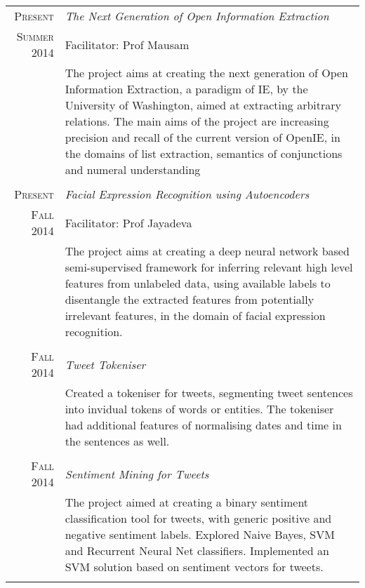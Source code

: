 \documentclass[a4paper,10pt]{article} %
\begin{document}
\begin{tabular}{r|p{11cm}}

\textsc{Present} & \emph{The Next Generation of Open Information Extraction}\\ 
\textsc{Summer 2014} & Facilitator: Prof Mausam \\ &\footnotesize{The project aims at creating the next generation of Open Information Extraction, a paradigm of IE, by the University of Washington, aimed at extracting arbitrary relations. The main aims of the project are increasing precision and recall of the current version of OpenIE, in  the domains of list extraction, semantics of conjunctions and numeral understanding }\\
\multicolumn{2}{c}{} \\


\textsc{Present} & \emph{Facial Expression Recognition using Autoencoders}\\ 
\textsc{Fall 2014} & Facilitator: Prof Jayadeva \\ & \footnotesize{The project aims at creating a deep neural network based semi-supervised framework for inferring relevant high level features from unlabeled data, using available labels to disentangle the extracted features from potentially irrelevant features, in the domain of facial expression recognition.}\\
\multicolumn{2}{c}{} \\


\textsc{Fall 2014}& \emph{Tweet Tokeniser}\\ 
 & \footnotesize{Created a tokeniser for tweets, segmenting tweet sentences into invidual tokens of words or entities. The tokeniser had additional features of normalising dates and time in the sentences as well.}\\
\multicolumn{2}{c}{} \\


\textsc{Fall 2014}& \emph{Sentiment Mining for Tweets}\\ 
 & \footnotesize{The project aimed at creating a binary sentiment classification tool for tweets, with generic positive and negative sentiment labels. Explored Naive Bayes, SVM and Recurrent Neural Net classifiers. Implemented an SVM solution based on sentiment vectors for tweets.}\\
\multicolumn{2}{c}{} \\


\end{tabular}
\end{document}
